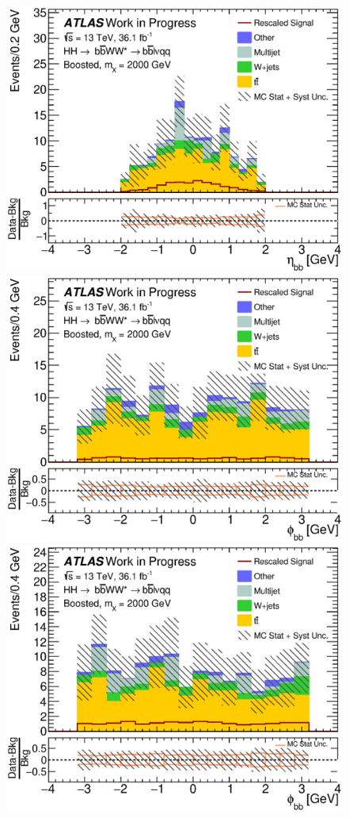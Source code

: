 \begin{figure}[h]
\begin{center}
\includegraphics[scale=0.33]{figures/kinplots/C_2tag_SR_muon_presel_met50_HbbEta}\\
\includegraphics[scale=0.33]{figures/kinplots/C_2tag_SR_elec_presel_met50_HbbPhi}
\includegraphics[scale=0.33]{figures/kinplots/C_2tag_SR_muon_presel_met50_HbbPhi}

\end{center}
\end{figure}
